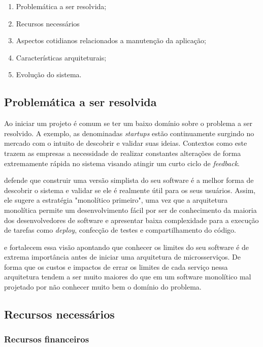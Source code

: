 \begin{enumerate}
    \item Problemática a ser resolvida;
    \item Recursos necessários
    \item Aspectos cotidianos relacionados a manutenção da aplicação;
    \item Características arquiteturais;
    \item Evolução do sistema.
\end{enumerate}

\subsection{Problemática a ser resolvida}
\label{Perpectivas:Problematica}

Ao iniciar um projeto é comum se ter um baixo domínio sobre o problema a ser resolvido. A exemplo,
as denominadas \textit{startups} estão continuamente surgindo no mercado com o intuito de descobrir
e validar suas ideias. Contextos como este trazem as empresas a necessidade de realizar constantes
alterações de forma extremamente rápida no sistema visando atingir um curto ciclo de
\textit{feedback}.

 defende que construir uma versão simplista do seu software é
a melhor forma de descobrir o sistema e validar se ele é realmente útil para os seus usuários.
Assim, ele sugere a estratégia "monolítico primeiro", uma vez que a arquitetura monolítica permite
um desenvolvimento fácil por ser de conhecimento da maioria dos desenvolvedores de software e
apresentar baixa complexidade para a execução de tarefas como \textit{deploy}, confecção de testes
e compartilhamento do código.

 e  fortalecem essa visão apontando
que conhecer os limites do seu software é de extrema importância antes de iniciar uma arquitetura de
microsserviços. De forma que os custos e impactos de errar os limites de cada serviço nessa arquitetura
tendem a ser muito maiores do que em um software monolítico mal projetado por não conhecer muito bem o
domínio do problema. 

\subsection{Recursos necessários}

\subsubsection{Recursos financeiros}

